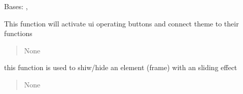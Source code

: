 \documentclass[letterpaper,10pt,english]{sphinxmanual}
\begin{document}
\begin{savenotes}\begin{fulllineitems}
\label{\detokenize{setting/setting_UI:oxin.setting_UI.UI_main_window}}
\pysigstartsignatures
{}
\pysigstopsignatures
\sphinxAtStartPar
Bases: , 

\begin{savenotes}\begin{fulllineitems}
\label{\detokenize{setting/setting_UI:oxin.setting_UI.UI_main_window.activate_}}
\pysigstartsignatures
{}
\pysigstopsignatures
\sphinxAtStartPar
This function will activate ui operating buttons and connect theme to their functions
\begin{quote}\begin{description}
\sphinxAtStartPar
None

\end{description}\end{quote}

\end{fulllineitems}\end{savenotes}


\begin{savenotes}\begin{fulllineitems}
\label{\detokenize{setting/setting_UI:oxin.setting_UI.UI_main_window.animation_move}}
\pysigstartsignatures
{}
\pysigstopsignatures
\sphinxAtStartPar
this function is used to shiw/hide an element (frame) with an sliding effect
\begin{quote}\begin{description}
\sphinxAtStartPar
None

\end{description}\end{quote}


\end{fulllineitems}
\end{savenotes}
\end{fulllineitems}
\end{savenotes}
\end{document}

